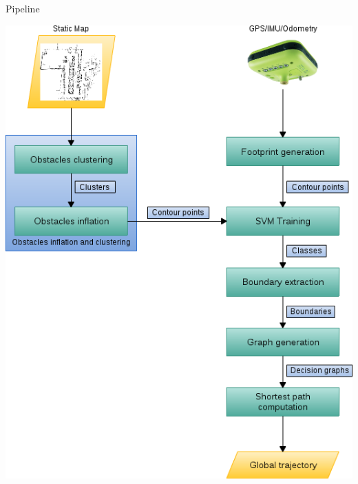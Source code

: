 \begin{frame}{Pipeline}
  \begin{center}
    \includegraphics{pipeline_cp06}
  \end{center}
  \note{
  }
\end{frame}

